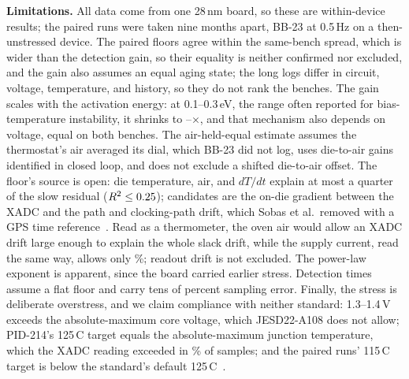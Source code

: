 \documentclass[10pt,twocolumn]{article}
\newcommand{\degC}{\,\textdegree C}
\begin{document}
\textbf{Limitations.} All data come from one 28\,nm board, so these are within-device results; the paired runs were taken nine months apart, BB-23 at 0.5\,Hz on a then-unstressed device. The paired floors agree within the same-bench spread, which is wider than the detection gain, so their equality is neither confirmed nor excluded, and the gain also assumes an equal aging state; the long logs differ in circuit, voltage, temperature, and history, so they do not rank the benches. The gain scales with the activation energy: at 0.1--0.3\,eV, the range often reported for bias-temperature instability, it shrinks to \vAFratioEaLo--\vAFratioEaHi$\times$, and that mechanism also depends on voltage, equal on both benches. The air-held-equal estimate assumes the thermostat's air averaged its dial, which BB-23 did not log, uses die-to-air gains identified in closed loop, and does not exclude a shifted die-to-air offset. The floor's source is open: die temperature, air, and $dT/dt$ explain at most a quarter of the slow residual ($R^2\le0.25$); candidates are the on-die gradient between the XADC and the path and clocking-path drift, which Sobas et al.\ removed with a GPS time reference~\cite{sobas}. Read as a thermometer, the oven air would allow an XADC drift large enough to explain the whole slack drift, while the supply current, read the same way, allows only \vThermoShare\%; readout drift is not excluded. The power-law exponent is apparent, since the board carried earlier stress. Detection times assume a flat floor and carry tens of percent sampling error. Finally, the stress is deliberate overstress, and we claim compliance with neither standard: 1.3--1.4\,V exceeds the absolute-maximum core voltage, which JESD22-A108 does not allow; PID-214's 125\degC{} target equals the absolute-maximum junction temperature, which the XADC reading exceeded in \vTjAbovePct\% of samples; and the paired runs' 115\degC{} target is below the standard's default 125\degC~\cite{jedec}.

\end{document}
